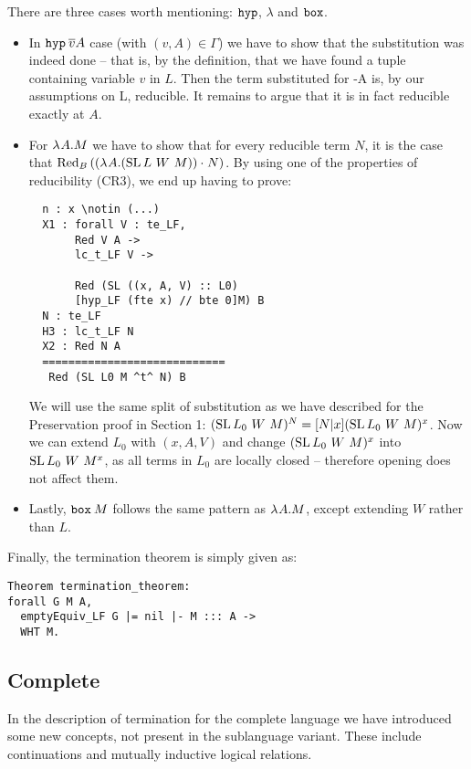 There are three cases worth mentioning: $\hype{}$, $\lambda$ and $\bboxe{}$.
\begin{itemize}
\item In $\hyp{\fvar{v}}A$ case (with $(v, A) \in \Gamma$) we have to show that the substitution was indeed done -- that is, by the definition, that we have found a tuple containing variable $v$ in $L$. Then the term substituted for \hyp{}A is, by our assumptions on L, reducible. It remains to argue that it is in fact reducible exactly at $A$.

\item For $\lamb{A}{M}$ we have to show that for every reducible term $N$, it is the case that
	$\Red{(\appl{(\lamb{A}{(\SL{L}{W}{M})})}{N})}{B}$. By using one of the properties of reducibility (CR3), we end up having to prove:

\newpage
\begin{verbatim} 
  n : x \notin (...)
  X1 : forall V : te_LF,
       Red V A -> 
       lc_t_LF V -> 

       Red (SL ((x, A, V) :: L0) 
       [hyp_LF (fte x) // bte 0]M) B
  N : te_LF
  H3 : lc_t_LF N
  X2 : Red N A
  ============================
   Red (SL L0 M ^t^ N) B
\end{verbatim}
We will use the same split of substitution as we have described for the Preservation proof in Section 1: $(\SL {L_0} W M)^N = \substt{N}{x}{(\SL{L_0}{W}{M})^x}$. Now we can extend $L_0$ with $(x, A, V)$ and change $(\SL {L_0} W M)^x$ into $\SL{L_0}{W}{M^x}$, as all terms in $L_0$ are locally closed -- therefore opening does not affect them.
\item Lastly, $\bboxb{M}$ follows the same pattern as $\lamb{A}{M}$, except extending $W$ rather than $L$.
\end{itemize}

Finally, the termination theorem is simply given as:
\begin{verbatim}
Theorem termination_theorem:
forall G M A,
  emptyEquiv_LF G |= nil |- M ::: A ->
  WHT M.
\end{verbatim}

\subsection{Complete \langLF{}}
In the description of termination for the complete \langLF{} language we have introduced some new concepts, not present in the sublanguage variant. These include continuations and mutually inductive logical relations.

